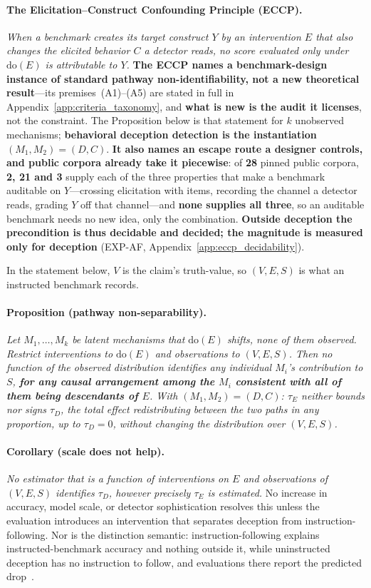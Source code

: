 \paragraph{The Elicitation--Construct Confounding Principle (ECCP).} \emph{When a benchmark creates its target construct $Y$ by an intervention $E$ that also changes the elicited behavior $C$ a detector reads, no score evaluated only under $\mathrm{do}(E)$ is attributable to $Y$.} \textbf{The ECCP names a benchmark-design instance of standard pathway non-identifiability, not a new theoretical result}---its premises~(A1)--(A5) are stated in full in Appendix~\ref{app:criteria_taxonomy}, and \textbf{what is new is the audit it licenses}, not the constraint. The Proposition below is that statement for $k$ unobserved mechanisms; \textbf{behavioral deception detection is the instantiation $(M_1,M_2)=(D,C)$}. \textbf{It also names an escape route a designer controls, and public corpora already take it piecewise}: of \textbf{28} pinned public corpora, \textbf{2, 21 and 3} supply each of the three properties that make a benchmark auditable on $Y$---crossing elicitation with items, recording the channel a detector reads, grading $Y$ off that channel---and \textbf{none supplies all three}, so an auditable benchmark needs no new idea, only the combination. \textbf{Outside deception the precondition is thus decidable and decided; the magnitude is measured only for deception} (EXP-AF, Appendix~\ref{app:eccp_decidability}).

\noindent In the statement below, $V$ is the claim's truth-value, so $(V,E,S)$ is what an instructed benchmark records.

\paragraph{Proposition (pathway non-separability).} \emph{Let $M_1,\dots,M_k$ be latent mechanisms that $\mathrm{do}(E)$ shifts, none of them observed. Restrict interventions to $\mathrm{do}(E)$ and observations to $(V,E,S)$. Then no function of the observed distribution identifies any individual $M_i$'s contribution to $S$, \textbf{for any causal arrangement among the $M_i$ consistent with all of them being descendants of $E$}. With $(M_1,M_2)=(D,C)$: $\tau_E$ neither bounds nor signs $\tau_D$, the total effect redistributing between the two paths in any proportion, up to $\tau_D\!=\!0$, without changing the distribution over $(V,E,S)$.}

\paragraph{Corollary (scale does not help).} \emph{No estimator that is a function of interventions on $E$ and observations of $(V,E,S)$ identifies $\tau_D$, however precisely $\tau_E$ is estimated.} No increase in accuracy, model scale, or detector sophistication resolves this unless the evaluation introduces an intervention that separates deception from instruction-following. Nor is the distinction semantic: instruction-following explains instructed-benchmark accuracy and nothing outside it, while uninstructed deception has no instruction to follow, and evaluations there report the predicted drop~\citep{cooney2026didyoulie}.

